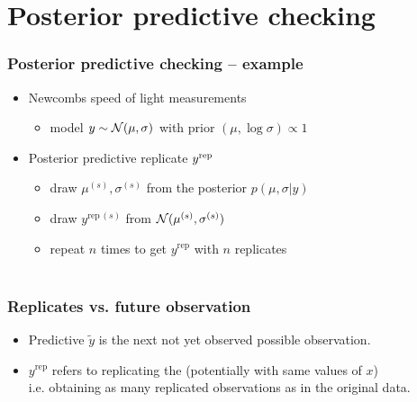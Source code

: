 \documentclass[10pt]{beamer}
\begin{document}
\section{Posterior predictive checking}
\frame{\sectionpage}

\begin{frame}[fragile]
\frametitle{Posterior predictive checking -- example}

  \begin{itemize}
  \item<1-> Newcombs speed of light measurements
    \begin{itemize}
    \item model $y \sim \mathcal{N}(\mu,\sigma)$ with prior $(\mu, \log \sigma) \propto 1$
    \end{itemize}
  \item<2-> Posterior predictive replicate $y^{\rm rep}$
    \begin{itemize}
    \item<3-> draw $\mu^{(s)},\sigma^{(s)}$ from the posterior $p(\mu,\sigma|y)$
    \item<4-> draw $y^{\mathrm{rep}\,(s)}$ from $\mathcal{N}(\mu^{(s)},\sigma^{(s)})$
    \item<5-> repeat $n$ times to get $y^{\mathrm{rep}}$ with $n$ replicates\\~\\
      \end{itemize}
    \end{itemize}

\end{frame}


\begin{frame}

\frametitle{Replicates vs. future observation}

  \begin{itemize}
  \item Predictive $\tilde{y}$ is the next not yet observed possible
    observation. \pause
    \item $y^{\mathrm{rep}}$ refers to replicating the  (potentially with same values of $x$)\\i.e. obtaining as
    many replicated observations as in the original data.
  \end{itemize}

\end{frame}
\end{document}
